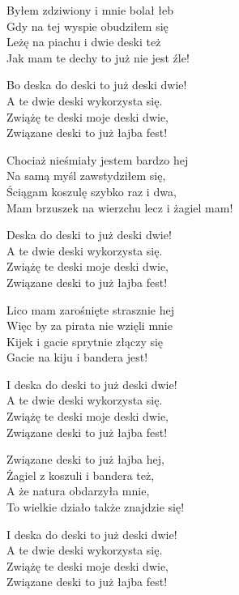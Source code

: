 \begin{text}
    Byłem zdziwiony i mnie bolał łeb\\
    Gdy na tej wyspie obudziłem się\\
    Leżę na piachu i dwie deski też\\
    Jak mam te dechy to już nie jest źle!

    \vin Bo deska do deski to już deski dwie!\\
    \vin A te dwie deski wykorzysta się.\\
    \vin Zwiążę te deski moje deski dwie,\\
    \vin Związane deski to już łajba fest!

    Chociaż nieśmiały jestem bardzo hej\\
    Na samą myśl zawstydziłem się,\\
    Ściągam koszulę szybko raz i dwa,\\
    Mam brzuszek na wierzchu lecz i żagiel mam!

    \vin Deska do deski to już deski dwie!\\
    \vin A te dwie deski wykorzysta się.\\
    \vin Zwiążę te deski moje deski dwie,\\
    \vin Związane deski to już łajba fest!

    Lico mam zarośnięte strasznie hej\\
    Więc by za pirata nie wzięli mnie\\
    Kijek i gacie sprytnie złączy się\\
    Gacie na kiju i bandera jest!

    \vin I deska do deski to już deski dwie!\\
    \vin A te dwie deski wykorzysta się.\\
    \vin Zwiążę te deski moje deski dwie,\\
    \vin Związane deski to już łajba fest!

    Związane deski to już łajba hej,\\
    Żagiel z koszuli i bandera też,\\
    A że natura obdarzyła mnie,\\
    To wielkie działo także znajdzie się!

    \vin I deska do deski to już deski dwie!\\
    \vin A te dwie deski wykorzysta się.\\
    \vin Zwiążę te deski moje deski dwie,\\
    \vin Związane deski to już łajba fest!


\end{text}
